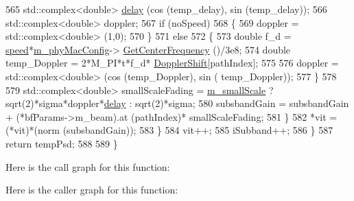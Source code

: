 \begin{DoxyCode}
565                                 std::complex<double> \hyperlink{lte_2model_2fading-traces_2fading__trace__generator_8m_a7964e6aa8f61a9d28973c8267a606ad8}{delay} (cos (temp\_delay), sin (temp\_delay));
566                                 std::complex<double> doppler;
567                                 \textcolor{keywordflow}{if} (noSpeed)
568                                 \{
569                                         doppler = std::complex<double> (1,0);
570                                 \}
571                                 \textcolor{keywordflow}{else}
572                                 \{
573                                         \textcolor{keywordtype}{double} f\_d = \hyperlink{mmwave-amc-test_8cc_a6dc6e6f3c75c509ce943163afb5dade7}{speed}*\hyperlink{classns3_1_1MmWaveBeamforming_a8984cd1f9d9597c3b555bfa98daad906}{m\_phyMacConfig}->
      \hyperlink{classns3_1_1MmWavePhyMacCommon_a0850d2e37c7075b9bce242723b722019}{GetCenterFrequency} ()/3e8;
574                                         \textcolor{keywordtype}{double} temp\_Doppler = 2*M\_PI*t*f\_d*
      \hyperlink{namespacens3_a927629da5996dd485d847a37aa7b3fd1}{DopplerShift}[pathIndex];
575 
576                                         doppler = std::complex<double> (cos (temp\_Doppler), sin (
      temp\_Doppler));
577                                 \}
578 
579                                 std::complex<double> smallScaleFading = 
      \hyperlink{classns3_1_1MmWaveBeamforming_a08a07e3ded70f591331ecb9f88482220}{m\_smallScale} ? sqrt(2)*sigma*doppler*\hyperlink{lte_2model_2fading-traces_2fading__trace__generator_8m_a7964e6aa8f61a9d28973c8267a606ad8}{delay} : sqrt(2)*sigma;
580                                 subsbandGain = subsbandGain + (*bfParams->m\_beam).at (pathIndex)*
      smallScaleFading;
581                         \}
582                         *vit = (*vit)*(norm (subsbandGain));
583                 \}
584                 vit++;
585                 iSubband++;
586         \}
587         \textcolor{keywordflow}{return} tempPsd;
588 
589 \}
\end{DoxyCode}


Here is the call graph for this function\+:




Here is the caller graph for this function\+:


